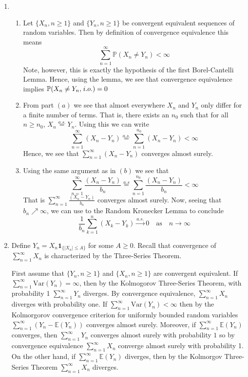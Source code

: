 \documentclass[12pt]{article}  %
\newcommand{\E}{{\mathbb{E}}}
\newcommand{\V}{{\text{Var}}}
\newcommand{\prob}{{\mathbb{P}}}
\newcommand{\ind}{{\mathbf{1}}}
\begin{document}
\begin{enumerate}
\item 
	\begin{enumerate}
		\item Let $\{X_n, n\geq 1\}$ and $\{Y_n, n\geq 1\}$ be convergent equivalent sequences of random variables. Then by definition of convergence equivalence this means $$\sum_{n=1}^{\infty}\prob(X_n \neq Y_n)<\infty$$ Note, however, this is exactly the hypothesis of the first Borel-Cantelli Lemma. Hence, using the lemma, we see that convergence equivalence implies $\prob(X_n \neq Y_n,\hspace{.1em} i.o.) = 0$
		\item From part $(a)$ we see that almost everywhere $X_n$ and $Y_n$ only differ for a finite number of terms. That is, there exists an $n_0$ such that for all $n\geq n_0$,  $X_n \overset{a.s.}{=} Y_n$. Using this we can write $$\sum_{n=1}^{\infty}(X_n - Y_n) \overset{a.s.}{=}\sum_{n=1}^{n_0}(X_n - Y_n)<\infty$$ Hence, we see that $\sum_{n=1}^{\infty}(X_n - Y_n)$ converges almost surely. 
		\item Using the same argument as in $(b)$ we see that $$\sum_{n=1}^{\infty}\frac{(X_n-Y_n)}{b_n} \overset{a.s}{=}\sum_{n=1}^{n_0}\frac{(X_n-Y_n)}{b_n}<\infty$$ That is $\sum_{n=1}^{\infty}\frac{(X_n-Y_n)}{b_n}$ converges almost surely. Now, seeing that $b_n\nearrow\infty$, we can use to the Random Kronecker Lemma to conclude $$\frac{1}{b_n}\sum_{k = 1}^{n}(X_k - Y_k)\overset{a.s.}{\longrightarrow} 0\hspace{1em}\text{as}\hspace{1em}n\to\infty$$

	\end{enumerate}	
\item Define $Y_n = X_n\ind_{\{|X_n|\leq A\}}$ for some $A\geq 0$. Recall that convergence of $\sum_{n=1}^{\infty}X_n$ is characterized by the Three-Series Theorem. 


First assume that $\{Y_n, n\geq 1\}$ and $\{X_n, n\geq 1\}$ are convergent equivalent. If $\sum_{n = 1}^{\infty}\V(Y_n) = \infty$, then by the Kolmogorov Three-Series Theorem, with probability 1 $\sum_{n=1}^{\infty}Y_n$ diverges. By convergence equivalence, $\sum_{n=1}^{\infty}X_n$ diverges with probability one. If $\sum_{n=1}^{\infty}\V(Y_n)<\infty$ then by the Kolmorgorov convergence criterion for uniformly bounded random variables $\sum_{n=1}^{\infty}(Y_n -\E(Y_n))$ converges almost surely. Moreover, if $\sum_{n=1}^{\infty}\E(Y_n)$ converges, then $\sum_{n=1}^{\infty}Y_n$ converges almost surely with probability $1$ so by convergence equivalence $\sum_{n=1}^{\infty}X_n$ converge almost surely with probability 1. On the other hand, if $\sum_{n=1}^{\infty}\E(Y_n)$ diverges, then by the Kolmorgov Three-Series Theorem $\sum_{n=1}^{\infty}X_n$ diverges.


\end{enumerate}
\end{document}
